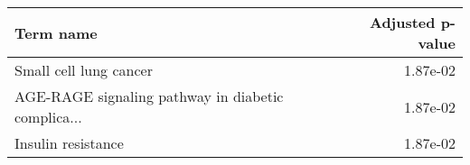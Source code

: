 \begin{tabular}{lr}
\toprule
                                         Term name &  Adjusted p-value \\
\midrule
                            Small cell lung cancer &          1.87e-02 \\
AGE-RAGE signaling pathway in diabetic complica... &          1.87e-02 \\
                                Insulin resistance &          1.87e-02 \\
\bottomrule
\end{tabular}
